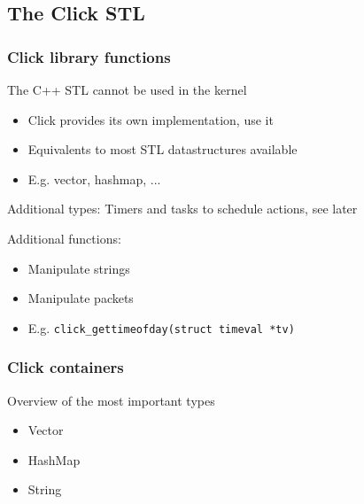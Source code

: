 \documentclass{beamer}
\begin{document}
\subsection{The Click STL} %
\label{sub:the_click_stl}

\begin{frame}
\frametitle{Click library functions}
The C++ STL cannot be used in the kernel
\begin{itemize}
	\item Click provides its own implementation, use it
	\item Equivalents to most STL datastructures available
	\item E.g. vector, hashmap, ...
\end{itemize}
Additional types: Timers and tasks to schedule actions, see later

Additional functions:
\begin{itemize}
	\item Manipulate strings
	\item Manipulate packets
	\item E.g. \lstinline!click_gettimeofday(struct timeval *tv)!
\end{itemize}
\end{frame}

\begin{frame}
\frametitle{Click containers}
Overview of the most important types
\begin{itemize}
	\item Vector
	\item HashMap
	\item String
\end{itemize}
\end{frame}
\end{document}
